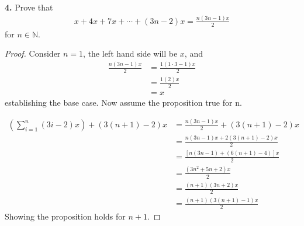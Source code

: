 \documentclass[12pt]{amsart}
\newenvironment{statement}[1]{\smallskip\noindent\color[rgb]{1.00,0.00,0.50} {\bf #1.}}{}
\theoremstyle{definition}
\theoremstyle{remark}
\newcommand{\BN}{\mathbb N}
\begin{document}
\begin{statement}{4}
  Prove that
  \begin{align*}
    x + 4x + 7x + \cdots + (3n-2)x = \frac{n(3n-1)x}{2}
  \end{align*}
  for $n \in \BN$.
\end{statement}
\begin{proof}
  Consider $n=1$, the left hand side will be $x$, and
  \begin{align*}
    \frac{n(3n-1)x}{2} &= \frac{1(1\cdot 3 -1)x}{2} \\
    &= \frac{1(2)x}{2} \\
    &= x
  \end{align*}
  establishing the base case. Now assume the proposition true for n.

  \begin{align*}
    \left (\sum_{i=1}^n (3i-2)x \right ) + (3(n+1) -2)x &= \frac{n(3n-1)x}{2}+(3(n+1) -2)x\\
    &= \frac{n(3n-1)x +2(3(n+1) -2)x}{2}\\
    &= \frac{[n(3n-1) +(6(n+1) -4)]x}{2}\\
    &= \frac{(3n^2+5n+2)x}{2}\\
    &= \frac{(n+1)(3n+2)x}{2}\\
    &= \frac{(n+1)(3(n+1) - 1)x}{2}
  \end{align*}
  Showing the proposition holds for $n+1$.
\end{proof}
\end{document}
